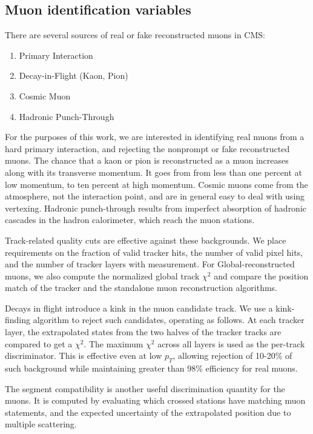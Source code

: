 \subsection{Muon identification variables}

There are several sources of real or fake reconstructed muons in CMS:
\begin{enumerate}
\item Primary Interaction
\item Decay-in-Flight (Kaon, Pion)
\item Cosmic Muon
\item Hadronic Punch-Through
\end{enumerate}
For the purposes of this work, we are interested in identifying real muons
from a hard primary interaction, and rejecting the nonprompt or fake reconstructed muons.
The chance that a kaon or pion is reconstructed as a muon increases along with its transverse momentum. It goes from from less than one percent at low momentum, to ten percent at high momentum.
Cosmic muons come from the atmosphere, not the interaction point,
and are in general easy to deal with using vertexing. Hadronic punch-through results from imperfect absorption
of hadronic cascades in the hadron calorimeter, which reach the muon stations.

Track-related quality cuts are effective against these backgrounds. We place requirements on
the fraction of valid tracker hits, the number of valid pixel hits, and the number of
tracker layers with measurement. For Global-reconstructed muons, we also compute the
normalized global track $\chi^2$ and compare the position match of the tracker and the standalone muon
reconstruction algorithms.

Decays in flight introduce a kink in the muon candidate track.
We use a kink-finding algorithm to reject such candidates, operating as follows.
At each tracker layer, the extrapolated states from the two halves of the tracker tracks are compared
to get a $\chi^2$. The maximum $\chi^2$ across all layers is used as the per-track discriminator.
This is effective even at low $p_{T}$, allowing rejection of 10-20\% of such background while
maintaining greater than 98\% efficiency for real muons.

The segment compatibility is another useful discrimination quantity for the muons.
It is computed by evaluating which crossed stations have matching muon statements,
and the expected uncertainty of the extrapolated position due to multiple scattering.

